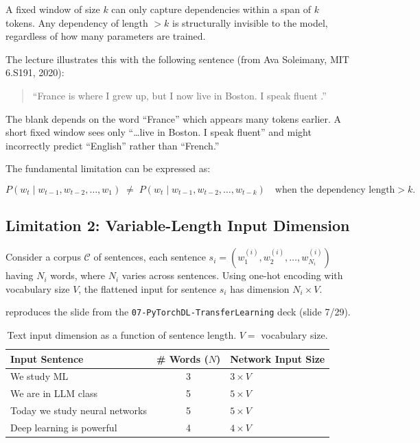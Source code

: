 \documentclass[12pt,a4paper]{article}
\begin{document}
\begin{warningbox}
A fixed window of size $k$ can only capture dependencies within a span of
$k$ tokens.  Any dependency of length $> k$ is structurally invisible to
the model, regardless of how many parameters are trained.
\end{warningbox}

The lecture illustrates this with the following sentence (from Ava Soleimany,
MIT 6.S191, 2020):

\begin{quote}
``France is where I grew up, but I now live in Boston.
 I speak fluent \underline{\hspace{1.5cm}}.''
\end{quote}

The blank depends on the word ``France'' which appears many tokens earlier.
A short fixed window sees only ``\ldots live in Boston. I speak fluent'' and
might incorrectly predict ``English'' rather than ``French.''

\vspace{0.5em}
The fundamental limitation can be expressed as:

\begin{equation}
  \label{eq:fixed_window}
  P(w_t \mid w_{t-1}, w_{t-2}, \ldots, w_1)
  \;\neq\;
  P(w_t \mid w_{t-1}, w_{t-2}, \ldots, w_{t-k})
  \quad \text{when the dependency length} > k.
\end{equation}

\subsection{Limitation 2: Variable-Length Input Dimension}
\label{subsec:variable_length}

Consider a corpus $\mathcal{C}$ of sentences, each sentence
$s_i = (w_1^{(i)}, w_2^{(i)}, \ldots, w_{N_i}^{(i)})$ having $N_i$ words,
where $N_i$ varies across sentences.  Using one-hot encoding with vocabulary
size $V$, the flattened input for sentence $s_i$ has dimension $N_i \times V$.

 reproduces the slide from the
\texttt{07-PyTorchDL-TransferLearning} deck (slide 7/29).

\begin{table}[ht]
  \centering
  \caption{Text input dimension as a function of sentence length.
           $V = $ vocabulary size.}
  \label{tab:varlen}
  \begin{tabular}{lcl}
    \toprule
    \textbf{Input Sentence} & \textbf{\# Words} ($N$) &
    \textbf{Network Input Size} \\
    \midrule
    We study ML               & 3 & $3 \times V$ \\
    We are in LLM class       & 5 & $5 \times V$ \\
    Today we study neural networks & 5 & $5 \times V$ \\
    Deep learning is powerful & 4 & $4 \times V$ \\
    \bottomrule
  \end{tabular}
\end{table}
\end{document}
